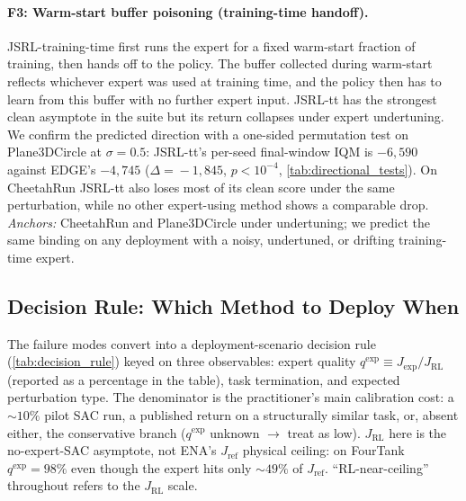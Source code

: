 \documentclass{article}
\begin{document}
\paragraph{F3: Warm-start buffer poisoning (training-time handoff).}
JSRL-training-time first runs the expert for a fixed warm-start
fraction of training, then hands off to the policy. The buffer
collected during warm-start reflects whichever expert was used at
training time, and the policy then has to learn from this buffer
with no further expert input. JSRL-tt has the strongest clean
asymptote in the suite but its return collapses under expert
undertuning. We confirm the predicted direction with a one-sided
permutation test on Plane3DCircle at $\sigma{=}0.5$: JSRL-tt's
per-seed final-window IQM is $-6{,}590$ against EDGE's $-4{,}745$
($\Delta\!=\!-1{,}845$, $p{<}10^{-4}$,
\cref{tab:directional_tests}). On CheetahRun JSRL-tt also loses
most of its clean score under the same perturbation, while no
other expert-using method shows a comparable drop.
\emph{Anchors:} CheetahRun and Plane3DCircle under undertuning; we
predict the same binding on any deployment with a noisy,
undertuned, or drifting training-time expert.

\subsection{Decision Rule: Which Method to Deploy When}
\label{sec:when-to-use}

The failure modes convert into a deployment-scenario decision rule
(\cref{tab:decision_rule}) keyed on three observables: expert
quality $q^{\mathrm{exp}} \equiv J_{\mathrm{exp}}/J_{\mathrm{RL}}$
(reported as a percentage in the table), task termination, and
expected perturbation type. The denominator is the practitioner's
main calibration cost: a $\sim$$10\%$ pilot SAC run, a published
return on a structurally similar task, or, absent either, the
conservative branch ($q^{\mathrm{exp}}$ unknown $\to$ treat as
low). $J_{\mathrm{RL}}$ here is the no-expert-SAC asymptote, not
ENA's $J_{\mathrm{ref}}$ physical ceiling: on FourTank
$q^{\mathrm{exp}}\!=\!98\%$ even though the expert hits only
$\sim$$49\%$ of $J_{\mathrm{ref}}$. ``RL-near-ceiling'' throughout
refers to the $J_{\mathrm{RL}}$ scale.
\end{document}
